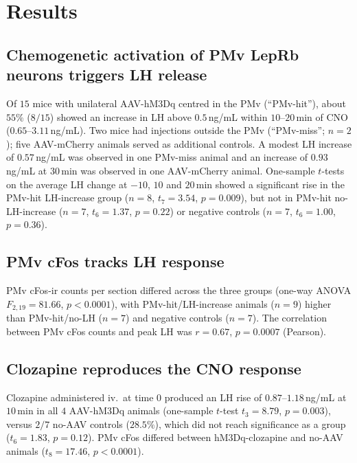\documentclass[11pt]{article}
\begin{document}
\section{Results}

\subsection{Chemogenetic activation of PMv LepRb neurons triggers LH release}
Of $15$ mice with unilateral AAV-hM3Dq centred in the PMv (``PMv-hit''), about $55\%$ ($8/15$) showed an increase in LH above $0.5$\,ng/mL within $10$--$20$\,min of CNO ($0.65$--$3.11$\,ng/mL). Two mice had injections outside the PMv (``PMv-miss''; $n=2$); five AAV-mCherry animals served as additional controls. A modest LH increase of $0.57$\,ng/mL was observed in one PMv-miss animal and an increase of $0.93$\,ng/mL at $30$\,min was observed in one AAV-mCherry animal. One-sample $t$-tests on the average LH change at $-10$, $10$ and $20$\,min showed a significant rise in the PMv-hit LH-increase group ($n=8$, $t_7 = 3.54$, $p = 0.009$), but not in PMv-hit no-LH-increase ($n=7$, $t_6 = 1.37$, $p = 0.22$) or negative controls ($n=7$, $t_6 = 1.00$, $p = 0.36$).

\subsection{PMv cFos tracks LH response}
PMv cFos-ir counts per section differed across the three groups (one-way ANOVA $F_{2,19} = 81.66$, $p < 0.0001$), with PMv-hit/LH-increase animals ($n=9$) higher than PMv-hit/no-LH ($n=7$) and negative controls ($n=7$). The correlation between PMv cFos counts and peak LH was $r = 0.67$, $p = 0.0007$ (Pearson).

\subsection{Clozapine reproduces the CNO response}
Clozapine administered iv.\ at time $0$ produced an LH rise of $0.87$--$1.18$\,ng/mL at $10$\,min in all $4$ AAV-hM3Dq animals (one-sample $t$-test $t_3 = 8.79$, $p = 0.003$), versus $2/7$ no-AAV controls ($28.5\%$), which did not reach significance as a group ($t_6 = 1.83$, $p = 0.12$). PMv cFos differed between hM3Dq-clozapine and no-AAV animals ($t_8 = 17.46$, $p < 0.0001$).
\end{document}
